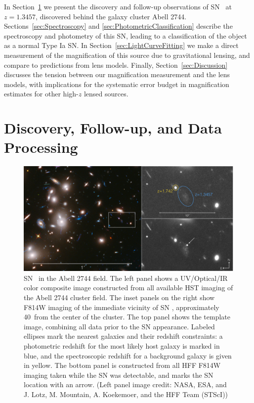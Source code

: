 In Section~\ref{sec:DiscoveryAndFollowup} we present the discovery and
follow-up observations of SN \tomas\ at $z=1.3457$, discovered behind the
galaxy cluster Abell 2744.  Sections~\ref{sec:Spectroscopy}
and \ref{sec:PhotometricClassification} describe the spectroscopy and
photometry of this SN, leading to a classification of the object as a
normal Type Ia SN.  In Section~\ref{sec:LightCurveFitting} we make a
direct measurement of the magnification of this source due to
gravitational lensing, and compare to predictions from lens models.
Finally, Section~\ref{sec:Discussion} discusses the tension between
our magnification measurement and the lens models, with implications
for the systematic error budget in magnification estimates for other
high-$z$ lensed sources.


\section{Discovery, Follow-up, and Data Processing}
\label{sec:DiscoveryAndFollowup}

\begin{figure}
\begin{center}
\includegraphics[width=\textwidth]{FIG/discovery_image_lowres}
\caption{  \label{fig:DiscoveryImage} 
SN \tomas\ in the Abell 2744 field.  The left panel shows a
UV/Optical/IR color composite image constructed from all available HST
imaging of the Abell 2744 cluster field.  The inset panels on the right
show F814W imaging of the immediate vicinity of SN \tomas,
approximately 40\arcsec\ from the center of the cluster. The top panel
shows the template image, combining all data prior to the SN
appearance.  Labeled ellipses mark the nearest galaxies and their
redshift constraints: a photometric redshift for the most likely host
galaxy is marked in blue, and the spectroscopic redshift for a
background galaxy is given in yellow. The bottom panel is constructed
from all HFF F814W imaging taken while the SN was detectable, and
marks the SN location with an arrow.  (Left panel image credit: NASA,
ESA, and J. Lotz, M. Mountain, A. Koekemoer, and the HFF Team (STScI))
}
\end{center}
\end{figure}


